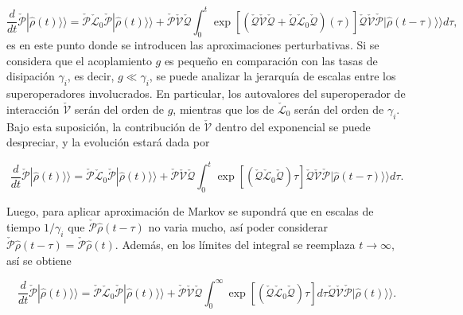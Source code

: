 \begin{appendixs}
\begin{equation*}
    \frac{d}{dt}\check{\mathcal{P}}|\hat{\rho}(t)\rangle \rangle = \check{\mathcal{P}}\check{\mathcal{L}}_{0}\check{\mathcal{P}}|\hat{\rho}(t)\rangle \rangle  + \check{\mathcal{P}}\check{\mathcal{V}}\check{\mathcal{Q}}\int_{0}^{t}\exp \left[\left(\check{\mathcal{Q}}\check{\mathcal{V}}\check{\mathcal{Q}} + \check{\mathcal{Q}}\check{\mathcal{L}}_{0}\check{\mathcal{Q}}\right) (\tau) \right]\check{\mathcal{Q}}\check{\mathcal{V}} \check{\mathcal{P}}|\hat{\rho}(t-\tau)\rangle \rangle d\tau,        
\end{equation*}
es en este punto donde se introducen las aproximaciones perturbativas. Si se considera que el acoplamiento \( g \) es pequeño en comparación con las tasas de disipación \(\gamma_i\), es decir, \( g \ll \gamma_i \), se puede analizar la jerarquía de escalas entre los superoperadores involucrados. En particular, los autovalores del superoperador de interacción \(\check{\mathcal{V}}\) serán del orden de \(g\), mientras que los de \(\check{\mathcal{L}}_0\) serán del orden de \(\gamma_i\). Bajo esta suposición, la contribución de \(\check{\mathcal{V}}\) dentro del exponencial se puede despreciar,  y la evolución estará dada por

\begin{equation*}
    \frac{d}{dt}\check{\mathcal{P}}|\hat{\rho}(t)\rangle \rangle = \check{\mathcal{P}}\check{\mathcal{L}}_{0}\check{\mathcal{P}}|\hat{\rho}(t)\rangle \rangle + \check{\mathcal{P}}\check{\mathcal{V}}\check{\mathcal{Q}}\int_{0}^{t}\exp \left[\left( \check{\mathcal{Q}}\check{\mathcal{L}}_{0}\check{\mathcal{Q}}\right)\tau \right]\check{\mathcal{Q}}\check{\mathcal{V}} \check{\mathcal{P}}|\hat{\rho}(t-\tau)\rangle \rangle d\tau.        
\end{equation*}

Luego, para aplicar aproximación de Markov se supondrá que en escalas de tiempo $1/\gamma_{i}$ que $\check{\mathcal{P}}\hat{\rho}(t-\tau)$ no varia mucho, así poder considerar $\check{\mathcal{P}}\hat{\rho}(t-\tau) = \check{\mathcal{P}}\hat{\rho}(t)$. Además, en los límites del integral se reemplaza $t \to \infty$, así se obtiene 

\begin{equation*}
    \frac{d}{dt}\check{\mathcal{P}}|\hat{\rho}(t)\rangle \rangle = \check{\mathcal{P}}\check{\mathcal{L}}_{0}\check{\mathcal{P}}|\hat{\rho}(t)\rangle \rangle + \check{\mathcal{P}}\check{\mathcal{V}}\check{\mathcal{Q}}\int_{0}^{\infty}\exp \left[\left( \check{\mathcal{Q}}\check{\mathcal{L}}_{0}\check{\mathcal{Q}}\right)\tau \right]d\tau \check{\mathcal{Q}}\check{\mathcal{V}} \check{\mathcal{P}}|\hat{\rho}(t)\rangle \rangle.        
\end{equation*}


\end{appendixs}
